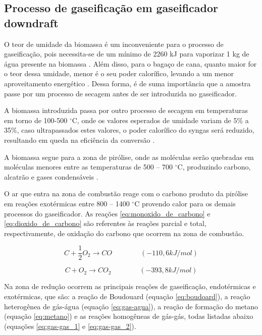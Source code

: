 \subsection{Processo de gaseificação em gaseificador downdraft}


O teor de umidade da biomassa é um inconveniente para o processo de gaseificação, pois necessita-se de um mínimo de 2260 kJ para vaporizar 1 kg de água presente na biomassa \cite{basu2010}. Além disso, para o bagaço de cana, quanto maior for o teor dessa umidade, menor é o seu poder calorífico, levando a um menor aproveitamento energético \cite{silva2008}. Dessa forma, é de suma importância que a amostra passe por um processo de secagem antes de ser introduzida no gaseificador.

A biomassa introduzida passa por outro processo de secagem em temperaturas em torno de 100-500 $^{\circ}$C, onde os valores esperados de umidade variam de 5\% a 35\%, caso ultrapassados estes valores, o poder calorífico do syngas será reduzido, resultando em queda na eficiência da conversão \cite{susastriawn2017}. 

A biomassa segue para a zona de pirólise, onde as moléculas serão quebradas em moléculas menores entre as temperaturas de 500 – 700 $^{\circ}$C, produzindo carbono, alcatrão e gases condensáveis \cite{basu2010}. 

O ar que entra na zona de combustão reage com o carbono produto da pirólise em reações exotérmicas entre 800 – 1400 $^{\circ}$C provendo calor para os demais processos do gaseificador. As reações \ref{eq:monoxido_de_carbono} e \ref{eq:dioxido_de_carbono} são referentes às reações parcial e total, respectivamente, de oxidação do carbono que ocorrem na zona de combustão.

\begin{equation} \label{eq:monoxido_de_carbono}
	C + \frac{1}{2} O_2 \rightarrow CO	\qquad \qquad	(-110,6 kJ/mol)
\end{equation}

\begin{equation} \label{eq:dioxido_de_carbono}
	C + O_2 \rightarrow CO_2	\qquad \qquad	(-393,8 kJ/mol)
\end{equation}

Na zona de redução ocorrem as principais reações de gaseificação, endotérmicas e exotérmicas, que são: a reação de Boudouard (equação \ref{eq:boudoard}), a reação heterogênea de gás-água (equação \ref{eq:gas-agua}), a reação de formação do metano (equação  \ref{eq:metano}) e as reações homogêneas de gás-gás, todas listadas abaixo (equações \ref{eq:gas-gas_1} e \ref{eq:gas-gas_2}).

